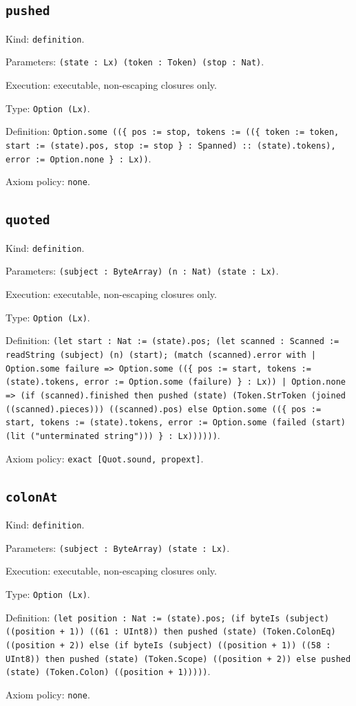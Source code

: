 \documentclass[11pt]{article}
\begin{document}
\subsection*{\texttt{pushed}}
\noindent Kind: \texttt{definition}.\par
\noindent Parameters: \texttt{(state : Lx) (token : Token) (stop : Nat)}.\par
\noindent Execution: executable, non-escaping closures only.\par
\noindent Type: \texttt{Option (Lx)}.\par
\noindent Definition: \texttt{Option.some ((\{ pos := stop, tokens := ((\{ token := token, start := (state).pos, stop := stop \} : Spanned) :: (state).tokens), error := Option.none \} : Lx))}.\par
\noindent Axiom policy: \texttt{none}.\par
\subsection*{\texttt{quoted}}
\noindent Kind: \texttt{definition}.\par
\noindent Parameters: \texttt{(subject : ByteArray) (n : Nat) (state : Lx)}.\par
\noindent Execution: executable, non-escaping closures only.\par
\noindent Type: \texttt{Option (Lx)}.\par
\noindent Definition: \texttt{(let start : Nat := (state).pos; (let scanned : Scanned := readString (subject) (n) (start); (match (scanned).error with | Option.some failure => Option.some ((\{ pos := start, tokens := (state).tokens, error := Option.some (failure) \} : Lx)) | Option.none => (if (scanned).finished then pushed (state) (Token.StrToken (joined ((scanned).pieces))) ((scanned).pos) else Option.some ((\{ pos := start, tokens := (state).tokens, error := Option.some (failed (start) (lit ("unterminated string"))) \} : Lx))))))}.\par
\noindent Axiom policy: \texttt{exact [Quot.sound, propext]}.\par
\subsection*{\texttt{colonAt}}
\noindent Kind: \texttt{definition}.\par
\noindent Parameters: \texttt{(subject : ByteArray) (state : Lx)}.\par
\noindent Execution: executable, non-escaping closures only.\par
\noindent Type: \texttt{Option (Lx)}.\par
\noindent Definition: \texttt{(let position : Nat := (state).pos; (if byteIs (subject) ((position + 1)) ((61 : UInt8)) then pushed (state) (Token.ColonEq) ((position + 2)) else (if byteIs (subject) ((position + 1)) ((58 : UInt8)) then pushed (state) (Token.Scope) ((position + 2)) else pushed (state) (Token.Colon) ((position + 1)))))}.\par
\noindent Axiom policy: \texttt{none}.\par
\end{document}
